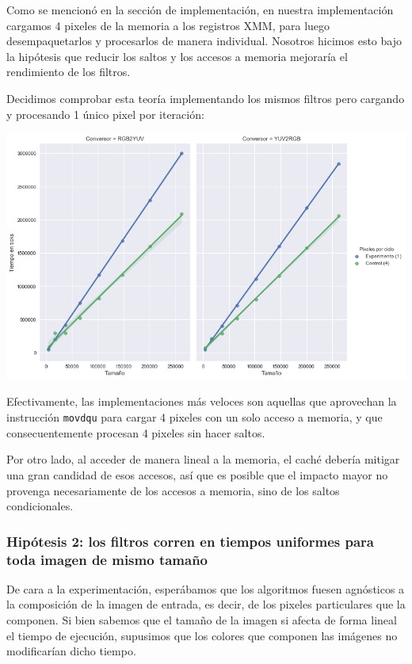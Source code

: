 Como se mencionó en la sección de implementación, en nuestra implementación cargamos 4 pixeles de la memoria a los registros XMM, para luego desempaquetarlos y procesarlos de manera individual. Nosotros hicimos esto bajo la hipótesis que reducir los saltos y los accesos a memoria mejoraría el rendimiento de los filtros.

Decidimos comprobar esta teoría implementando los mismos filtros pero cargando y procesando 1 único pixel por iteración:

\begin{center}
	\includegraphics[scale=0.5]{img/conversores_1pixel.png}
\end{center}

Efectivamente, las implementaciones más veloces son aquellas que aprovechan la instrucción \texttt{movdqu} para cargar 4 pixeles con un solo acceso a memoria, y que consecuentemente procesan 4 pixeles sin hacer saltos.

Por otro lado, al acceder de manera lineal a la memoria, el caché debería mitigar una gran candidad de esos accesos, así que es posible que el impacto mayor no provenga necesariamente de los accesos a memoria, sino de los saltos condicionales.

\subsubsection*{Hipótesis 2: los filtros corren en tiempos uniformes para toda imagen de mismo tamaño}

De cara a la experimentación, esperábamos que los algoritmos fuesen agnósticos a la composición de la imagen de entrada, es decir, de los pixeles particulares que la componen. Si bien sabemos que el tamaño de la imagen si afecta de forma lineal el tiempo de ejecución, supusimos que los colores que componen las imágenes no modificarían dicho tiempo.

